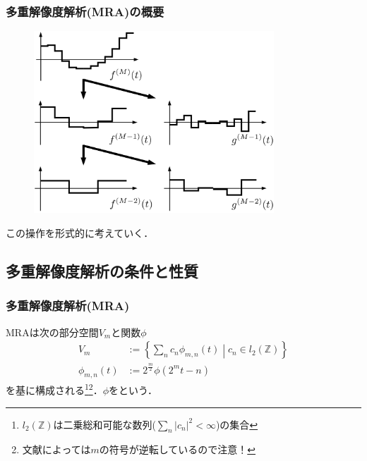 \documentclass[dvipdfmx,graphicx,14pt]{beamer}
\begin{document}
\begin{frame}[c]
    \frametitle{多重解像度解析(MRA)の概要}
    \begin{figure}
        \includegraphics[width=90mm]{./figs/rma_absraction.png}
    \end{figure}
    この操作を形式的に考えていく．
\end{frame}

\subsection{多重解像度解析の条件と性質}

\begin{frame}[c]
    \frametitle{多重解像度解析(MRA)}
    MRAは次の部分空間$V_{m}$と関数$\phi$
    \begin{align}
        V_{m} &:= \left\{ \sum_{n} c_{n} \phi_{m,n}(t) \middle| c_{n} \in l_{2}(\mathbb{Z}) \right\} \\
        \phi_{m,n}(t) &:= 2^{\frac{m}{2}}\phi(2^{m}t - n)
    \end{align}
    を基に構成される\footnote{$l_{2}(\mathbb{Z})$は二乗総和可能な数列($\sum_{n} |c_{n}|^{2} < \infty$)の集合}\footnote{文献によっては$m$の符号が逆転しているので注意！}．$\phi$をという．
\end{frame}
\end{document}
